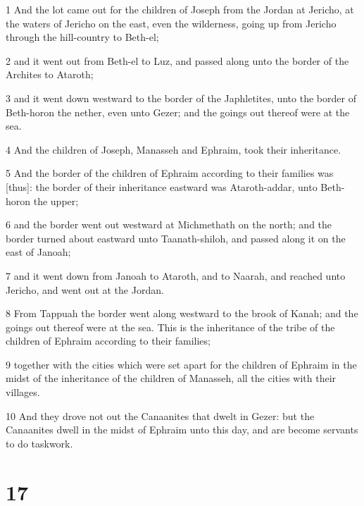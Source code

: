 \par 1 And the lot came out for the children of Joseph from the Jordan at Jericho, at the waters of Jericho on the east, even the wilderness, going up from Jericho through the hill-country to Beth-el;
\par 2 and it went out from Beth-el to Luz, and passed along unto the border of the Archites to Ataroth;
\par 3 and it went down westward to the border of the Japhletites, unto the border of Beth-horon the nether, even unto Gezer; and the goings out thereof were at the sea.
\par 4 And the children of Joseph, Manasseh and Ephraim, took their inheritance.
\par 5 And the border of the children of Ephraim according to their families was [thus]: the border of their inheritance eastward was Ataroth-addar, unto Beth-horon the upper;
\par 6 and the border went out westward at Michmethath on the north; and the border turned about eastward unto Taanath-shiloh, and passed along it on the east of Janoah;
\par 7 and it went down from Janoah to Ataroth, and to Naarah, and reached unto Jericho, and went out at the Jordan.
\par 8 From Tappuah the border went along westward to the brook of Kanah; and the goings out thereof were at the sea. This is the inheritance of the tribe of the children of Ephraim according to their families;
\par 9 together with the cities which were set apart for the children of Ephraim in the midst of the inheritance of the children of Manasseh, all the cities with their villages.
\par 10 And they drove not out the Canaanites that dwelt in Gezer: but the Canaanites dwell in the midst of Ephraim unto this day, and are become servants to do taskwork.

\chapter{17}


